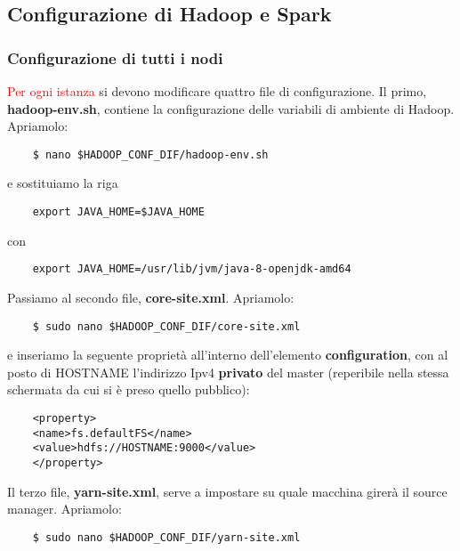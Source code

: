 \subsection{Configurazione di Hadoop e Spark}



\subsubsection{Configurazione di tutti i nodi}

\textcolor{red}{Per ogni istanza} si devono modificare quattro file di configurazione. Il primo, \textbf{hadoop-env.sh}, contiene la configurazione delle variabili di ambiente di Hadoop. Apriamolo:

\begin{verbatim}
    $ nano $HADOOP_CONF_DIF/hadoop-env.sh
\end{verbatim}

e sostituiamo la riga

\begin{verbatim}
    export JAVA_HOME=$JAVA_HOME
\end{verbatim}

con

\begin{verbatim}
    export JAVA_HOME=/usr/lib/jvm/java-8-openjdk-amd64
\end{verbatim}

Passiamo al secondo file, \textbf{core-site.xml}. Apriamolo:

\begin{verbatim}
    $ sudo nano $HADOOP_CONF_DIF/core-site.xml
\end{verbatim}

e inseriamo la seguente proprietà all'interno dell'elemento \textbf{\textlangle configuration\textrangle}, con al posto di HOSTNAME l'indirizzo Ipv4 \textbf{privato} del master (reperibile nella stessa schermata da cui si è preso quello pubblico):

\begin{verbatim}
    <property>
    <name>fs.defaultFS</name>
    <value>hdfs://HOSTNAME:9000</value>
    </property>
\end{verbatim}

Il terzo file, \textbf{yarn-site.xml}, serve a impostare su quale macchina girerà il source manager. Apriamolo:

\begin{verbatim}
    $ sudo nano $HADOOP_CONF_DIF/yarn-site.xml
\end{verbatim}


